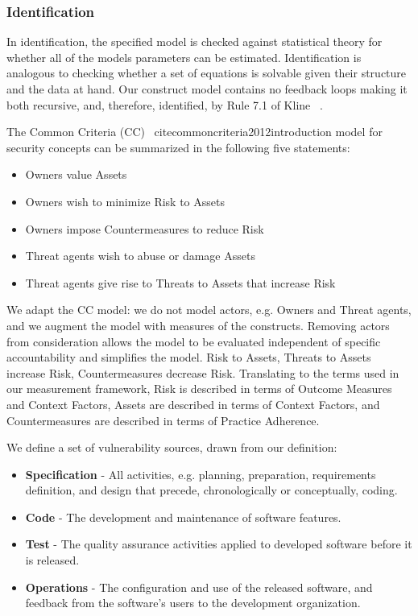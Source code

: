 \subsubsection{Identification}
In identification, the specified model is checked against statistical theory for whether all of the models parameters can be estimated. Identification is analogous to checking whether a set of equations is solvable given their structure and the data at hand.  Our construct model contains no feedback loops making it both recursive, and, therefore, identified, by Rule 7.1 of Kline ~\cite{kline2015principles}.  



The Common Criteria (CC) ~cite{commoncriteria2012introduction} model for security concepts can be summarized in the following five statements:
\begin{itemize}
	\item Owners value Assets
	\item Owners wish to minimize Risk to Assets
	\item Owners impose Countermeasures to reduce Risk
	\item Threat agents wish to abuse or damage Assets
	\item Threat agents give rise to Threats to Assets that increase Risk
\end{itemize}

We adapt the CC model: we do not model actors, e.g. Owners and Threat agents, and we augment the model with measures of the constructs. Removing actors from consideration allows the model to be evaluated independent of specific accountability and simplifies the model. Risk to Assets, Threats to Assets increase Risk, Countermeasures decrease Risk. Translating to the terms used in our measurement framework, Risk is described in terms of Outcome Measures and Context Factors, Assets are described in terms of Context Factors, and Countermeasures are described in terms of Practice Adherence.

We define a set of vulnerability sources, drawn from our definition:  
\begin{itemize}
	\item \textbf{Specification} - All activities, e.g. planning, preparation, requirements definition, and design that precede, chronologically or conceptually, coding. 
	\item \textbf{Code} - The development and maintenance of software features.
	\item \textbf{Test} - The quality assurance activities applied to developed software before it is released.
	\item \textbf{Operations} - The configuration and use of the released software, and feedback from the software's users to the development organization.
\end{itemize} 

